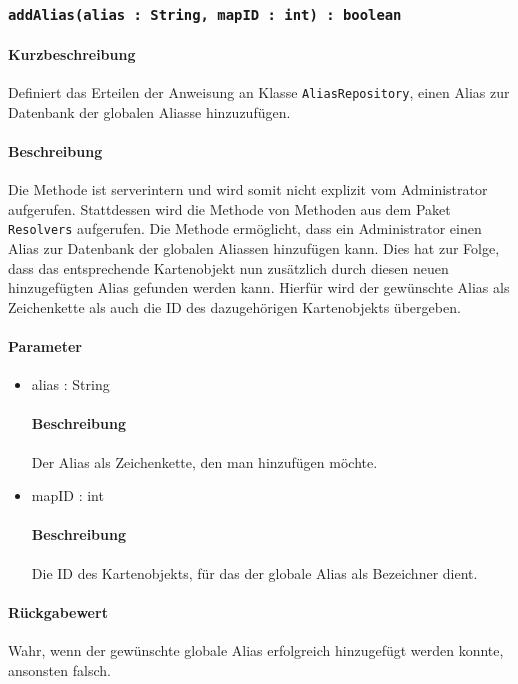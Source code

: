 \subsubsection{\texttt{addAlias(alias : String, mapID : int) : boolean}}%
\paragraph*{Kurzbeschreibung}
Definiert das Erteilen der Anweisung an Klasse \texttt{AliasRepository}, einen Alias zur Datenbank der globalen Aliasse hinzuzufügen.
\paragraph*{Beschreibung}
Die Methode ist serverintern und wird somit nicht explizit vom Administrator aufgerufen.
Stattdessen wird die Methode von Methoden aus dem Paket \texttt{Resolvers} aufgerufen.
Die Methode ermöglicht, dass ein Administrator einen Alias zur Datenbank der globalen Aliassen hinzufügen kann.
Dies hat zur Folge, dass das entsprechende Kartenobjekt nun zusätzlich durch diesen neuen hinzugefügten Alias gefunden werden kann.
Hierfür wird der gewünschte Alias als Zeichenkette als auch die ID des dazugehörigen Kartenobjekts übergeben.
\paragraph*{Parameter}
\begin{itemize}
    \item alias : String
    		\paragraph*{Beschreibung}
    		Der Alias als Zeichenkette, den man hinzufügen möchte.
    \item mapID : int
    		\paragraph*{Beschreibung}
    		Die ID des Kartenobjekts, für das der globale Alias als Bezeichner dient.
\end{itemize}
\paragraph*{Rückgabewert}
Wahr, wenn der gewünschte globale Alias erfolgreich hinzugefügt werden konnte, ansonsten falsch.
